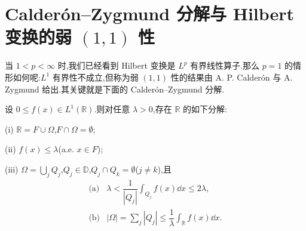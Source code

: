 \section{\texorpdfstring{Calder\'on--Zygmund 分解与 Hilbert 变换的弱 $(1,1)$ 性}{Calderon--Zygmund 分解与 Hilbert 变换的弱 (1,1) 性}}\label{sec:1.8}


当 $1 < p < \infty$ 时,我们已经看到 Hilbert 变换是 $L^{p}$ 有界线性算子.那么 $p = 1$ 的情形如何呢:$L^{1}$ 有界性不成立,但称为弱 $(1,1)$ 性的结果由 A. P. Calderón 与 A. Zygmund 给出.其关键就是下面的 Calderón--Zygmund 分解.

\begin{lemma}\label{lem:1.8.1}
设 $0 \leq f(x) \in L^{1}(\mathbb{R})$.则对任意 $\lambda > 0$,存在 $\mathbb{R}$ 的如下分解:

(i) $\mathbb{R} = F \cup \Omega$,$F \cap \Omega = \emptyset$;

(ii) $f(x) \leq \lambda$(a.e. $x \in F$);

(iii) $\Omega = \bigcup_{j} Q_{j}$,$Q_{j} \in \mathbb{D}$,$Q_{j} \cap Q_{k} = \emptyset$($j \neq k$),且
\begin{align*}
\text{(a)} & \lambda < \dfrac{1}{|Q_{j}|}\displaystyle\int_{Q_{j}} f(x)\dd x \leq 2\lambda, \\[4pt]
\text{(b)} & |\Omega| = \displaystyle\sum_{j}|Q_{j}| \leq \dfrac{1}{\lambda}\displaystyle\int_{\mathbb{R}} f(x)\dd x.
\end{align*}
\end{lemma}

